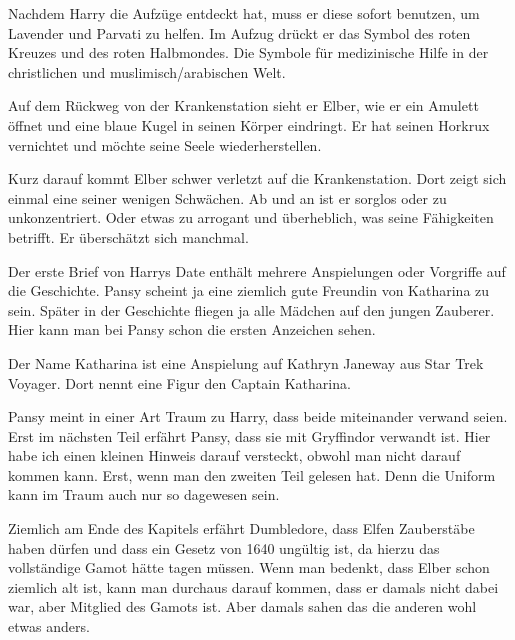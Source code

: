 \begin{kommentar}
Nachdem Harry die Aufzüge entdeckt hat, muss er diese sofort benutzen, um Lavender und Parvati zu helfen. Im Aufzug drückt er das Symbol des roten Kreuzes und des roten Halbmondes. Die Symbole für medizinische Hilfe in der christlichen und muslimisch/arabischen Welt.
\end{kommentar}

\begin{kommentar}
Auf dem Rückweg von der Krankenstation sieht er Elber, wie er ein Amulett öffnet und eine blaue Kugel in seinen Körper eindringt. Er hat seinen Horkrux vernichtet und möchte seine Seele wiederherstellen.
\end{kommentar}

\begin{kommentar}
Kurz darauf kommt Elber schwer verletzt auf die Krankenstation. Dort zeigt sich einmal eine seiner wenigen Schwächen. Ab und an ist er sorglos oder zu unkonzentriert. Oder etwas zu arrogant und überheblich, was seine Fähigkeiten betrifft. Er überschätzt sich manchmal.
\end{kommentar}

\begin{kommentar}
Der erste Brief von Harrys Date enthält mehrere Anspielungen oder Vorgriffe auf die Geschichte. Pansy scheint ja eine ziemlich gute Freundin von Katharina zu sein. Später in der Geschichte fliegen ja alle Mädchen auf den jungen Zauberer. Hier kann man bei Pansy schon die ersten Anzeichen sehen.
\end{kommentar}

\begin{kommentar}
Der Name Katharina ist eine Anspielung auf Kathryn Janeway aus Star Trek Voyager. Dort nennt eine Figur den Captain Katharina.
\end{kommentar}

\begin{kommentar}
Pansy meint in einer Art Traum zu Harry, dass beide miteinander verwand seien. Erst im nächsten Teil erfährt Pansy, dass sie mit Gryffindor verwandt ist. Hier habe ich einen kleinen Hinweis darauf versteckt, obwohl man nicht darauf kommen kann. Erst, wenn man den zweiten Teil gelesen hat. Denn die Uniform kann im Traum auch nur so dagewesen sein.
\end{kommentar}

\begin{kommentar}
Ziemlich am Ende des Kapitels erfährt Dumbledore, dass Elfen Zauberstäbe haben dürfen und dass ein Gesetz von 1640 ungültig ist, da hierzu das vollständige Gamot hätte tagen müssen. Wenn man bedenkt, dass Elber schon ziemlich alt ist, kann man durchaus darauf kommen, dass er damals nicht dabei war, aber Mitglied des Gamots ist. Aber damals sahen das die anderen wohl etwas anders.
\end{kommentar}

